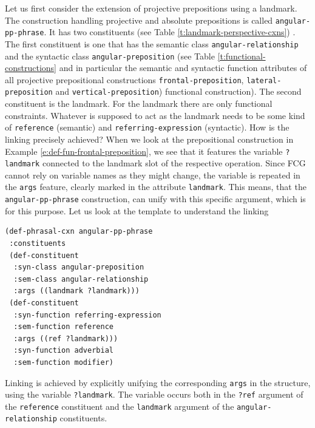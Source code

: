 Let us first consider the extension of projective prepositions 
using a landmark. The construction handling projective and absolute 
prepositions is called {\footnotesize\tt angular-pp-phrase}. It has two constituents
(see Table \ref{t:landmark-perspective-cxns}) . 
The first constituent is one that has the semantic 
class {\footnotesize\tt angular-relationship} and the syntactic class 
{\footnotesize\tt angular-preposition} (see Table 
\ref{t:functional-constructions} and in particular the semantic and 
syntactic function attributes of all projective 
prepositional constructions {\footnotesize\tt frontal-preposition},
{\footnotesize\tt lateral-preposition} and {\footnotesize\tt vertical-preposition})
functional construction). The second constituent is 
the landmark. For the landmark there are only functional constraints. 
Whatever is supposed to act as the landmark needs to be some kind of
{\footnotesize\tt reference} (semantic) and {\footnotesize\tt referring-expression} (syntactic). 
How is the linking precisely achieved? 
When we look at the prepositional construction in Example 
\ref{e:def-fun-frontal-preposition}, we see that it features the variable 
{\footnotesize\tt ?landmark} connected to the landmark slot of the respective 
operation. Since FCG cannot rely on variable names as they 
might change, the variable is repeated in the {\footnotesize\tt args} feature, 
clearly marked in the attribute {\footnotesize\tt landmark}. 
This means, that the {\footnotesize\tt angular-pp-phrase} construction, 
can unify with this specific argument, which is  for this purpose. 
Let us look at the template to understand the linking

\begin{example}
\begin{footnotesize}
\begin{verbatim}
(def-phrasal-cxn angular-pp-phrase
 :constituents
 (def-constituent
  :syn-class angular-preposition 
  :sem-class angular-relationship
  :args ((landmark ?landmark)))
 (def-constituent
  :syn-function referring-expression
  :sem-function reference
  :args ((ref ?landmark)))
  :syn-function adverbial
  :sem-function modifier)
\end{verbatim}
\end{footnotesize}
\label{e:angular-pp-phrase}
\end{example}
Linking is achieved by explicitly unifying the corresponding 
{\footnotesize\tt args} in the structure, using the variable
{\footnotesize\tt ?landmark}. The variable occurs both in the {\footnotesize\tt ?ref} 
argument of the {\footnotesize\tt reference} constituent 
and the {\footnotesize\tt landmark} argument of the 
{\footnotesize\tt angular-relationship} constituents. 


